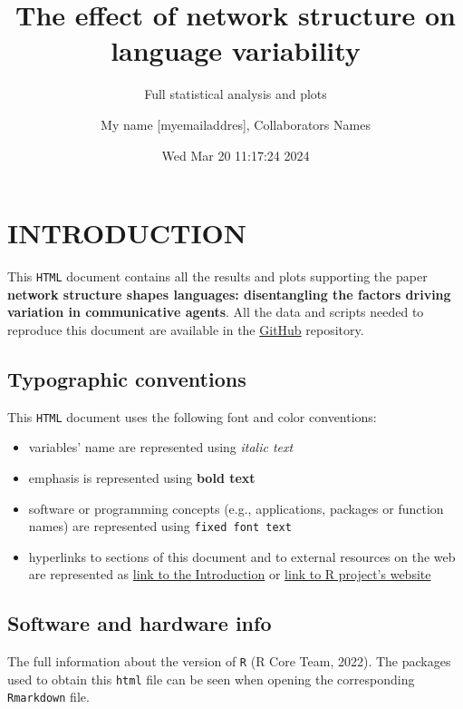 \documentclass[
]{article}
\title{The effect of network structure on language variability}
\subtitle{Full statistical analysis and plots}
\author{My name {[}myemailaddres{]}, Collaborators Names}
\date{Wed Mar 20 11:17:24 2024}
\providecommand{\tightlist}{%
  \setlength{\itemsep}{0pt}\setlength{\parskip}{0pt}}
\begin{document}
\maketitle

{
\setcounter{tocdepth}{6}
\tableofcontents
}
\hypertarget{introduction}{%
\section{INTRODUCTION}\label{introduction}}

This \texttt{HTML} document contains all the results and plots
supporting the paper \textbf{network structure shapes languages:
disentangling the factors driving variation in communicative agents}.
All the data and scripts needed to reproduce this document are available
in the \href{https://github.com/mathjoss/NetworkStructure_ABM}{GitHub}
repository.

\hypertarget{typographic-conventions}{%
\subsection{Typographic conventions}\label{typographic-conventions}}

This \texttt{HTML} document uses the following font and color
conventions:

\begin{itemize}
\tightlist
\item
  variables' name are represented using \emph{italic text}
\item
  emphasis is represented using \textbf{bold text}
\item
  software or programming concepts (e.g., applications, packages or
  function names) are represented using \texttt{fixed\ font\ text}
\item
  hyperlinks to sections of this document and to external resources on
  the web are represented as \protect\hyperlink{introduction}{link to
  the Introduction} or \href{https://www.r-project.org/}{link to R
  project's website}
\end{itemize}

\hypertarget{software-and-hardware-info}{%
\subsection{Software and hardware
info}\label{software-and-hardware-info}}

The full information about the version of \texttt{R} (R Core Team,
2022). The packages used to obtain this \texttt{html} file can be seen
when opening the corresponding \texttt{Rmarkdown} file.
\end{document}
